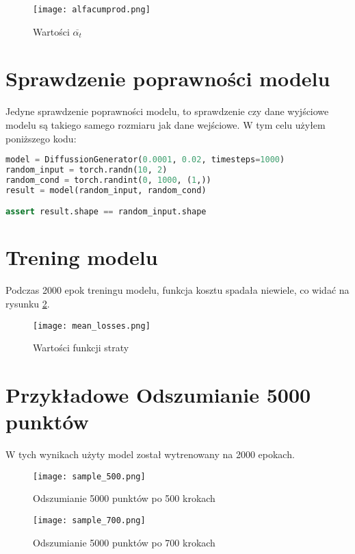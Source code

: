 \documentclass[a4paper]{article}
\begin{document}
\begin{figure}[H]
    \centering
    \texttt{[image: alfacumprod.png]}
    \caption{Wartości $\overline{\alpha_t}$}
    \label{fig:alphacumprod_sigmoid}
\end{figure}

\section{Sprawdzenie poprawności modelu}

Jedyne sprawdzenie poprawności modelu, to sprawdzenie czy dane wyjściowe modelu
są takiego samego rozmiaru jak dane wejściowe. W tym celu użyłem poniższego kodu:

\begin{lstlisting}[language=Python]
model = DiffussionGenerator(0.0001, 0.02, timesteps=1000)
random_input = torch.randn(10, 2)
random_cond = torch.randint(0, 1000, (1,))
result = model(random_input, random_cond)

assert result.shape == random_input.shape
\end{lstlisting}

\section{Trening modelu}

Podczas 2000 epok treningu modelu, funkcja kosztu spadała niewiele, co widać na rysunku \ref{fig:loss}.

\begin{figure}[H]
    \centering
    \texttt{[image: mean\_losses.png]}
    \caption{Wartości funkcji straty}
    \label{fig:loss}
\end{figure}

\section{Przykładowe Odszumianie 5000 punktów}
W tych wynikach użyty model został wytrenowany na 2000 epokach.

\begin{figure}[H]
    \centering
    \texttt{[image: sample\_500.png]}
    \caption{Odszumianie 5000 punktów po 500 krokach}
    \label{fig:sample_500}
\end{figure}

\begin{figure}[H]
    \centering
    \texttt{[image: sample\_700.png]}
    \caption{Odszumianie 5000 punktów po 700 krokach}
    \label{fig:sample_700}
\end{figure}
\end{document}
